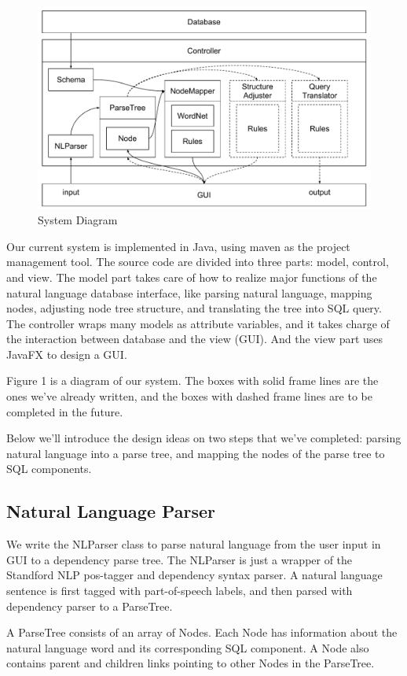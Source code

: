 \documentclass[twocolumn]{article}
\begin{document}
\begin{figure}[ht]
  \centering
  \includegraphics[width=0.8\linewidth]{figures/nlidb_system_diagram.pdf}
  \caption{System Diagram}
\end{figure}

Our current system is implemented in Java, using maven as the project management tool. The source code are divided into three parts: model, control, and view. The model part takes care of how to realize major functions of the natural language database interface, like parsing natural language, mapping nodes, adjusting node tree structure, and translating the tree into SQL query. The controller wraps many models as attribute variables, and it takes charge of the interaction between database and the view (GUI). And the view part uses JavaFX to design a GUI.

Figure 1 is a diagram of our system. The boxes with solid frame lines are the ones we've already written, and the boxes with dashed frame lines are to be completed in the future. 

Below we’ll introduce the design ideas on two steps that we’ve completed: parsing natural language into a parse tree, and mapping the nodes of the parse tree to SQL components.

\subsection{Natural Language Parser}
We write the NLParser class to parse natural language from the user input in GUI to a dependency parse tree. The NLParser is just a wrapper of the Standford NLP pos-tagger and dependency syntax parser. A natural language sentence is first tagged with part-of-speech labels, and then parsed with dependency parser to a ParseTree.

A ParseTree consists of an array of Nodes. Each Node has information about the natural language word and its corresponding SQL component. A Node also contains parent and children links pointing to other Nodes in the ParseTree.
\end{document}

